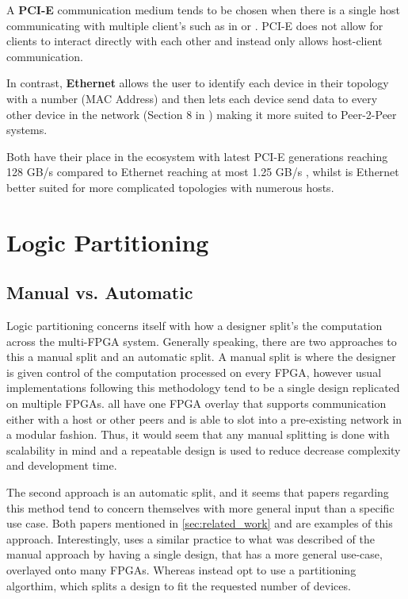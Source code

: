 A \textbf{PCI-E} communication medium tends to be chosen when there is a single host communicating with multiple client's such as in \cite{10.1145/3337821.3337846} or \cite{6927459}. PCI-E does not allow for clients to interact directly with each other and instead only allows host-client communication. 

In contrast, \textbf{Ethernet} allows the user to identify each device in their topology with a number (MAC Address) and then lets each device send data to every other device in the network (Section 8 in \cite{6847097}) making it more suited to Peer-2-Peer systems. 

Both have their place in the ecosystem with latest PCI-E generations reaching 128 GB/s \cite{pcie-speed} compared to Ethernet reaching at most 1.25 GB/s \cite{ether-speed}, whilst is Ethernet better suited for more complicated topologies with numerous hosts.

\section{Logic Partitioning}

\subsection{Manual vs. Automatic}

Logic partitioning concerns itself with how a designer split's the computation across the multi-FPGA system. Generally speaking, there are two approaches to this a manual split and an automatic split. A manual split is where the designer is given control of the computation processed on every FPGA, however usual implementations following this methodology tend to be a single design replicated on multiple FPGAs. \cite{10.1145/3020078.3021739, 10.1145/3358192, 10.1145/3337821.3337846} all have one FPGA overlay that supports communication either with a host or other peers and is able to slot into a pre-existing network in a modular fashion. Thus, it would seem that any manual splitting is done with scalability in mind and a repeatable design is used to reduce decrease complexity and development time.

The second approach is an automatic split, and it seems that papers regarding this method tend to concern themselves with more general input than a specific use case. Both papers mentioned in \autoref{sec:related_work} and \cite{soton261305} are examples of this approach. Interestingly, \cite{707888} uses a similar practice to what was described of the manual approach by having a single design, that has a more general use-case, overlayed onto many FPGAs. Whereas \cite{564741, soton261305} instead opt to use a partitioning algorthim, which splits a design to fit the requested number of devices. 

